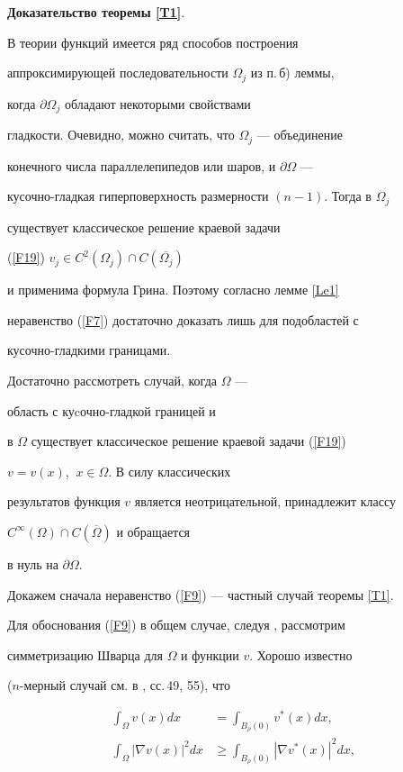 {\bf Доказательство теоремы \ref{T1}}.


В теории функций имеется ряд способов построения 


аппроксимирующей последовательности $\Omega_j$ из п.\,б) леммы, 


когда $\partial\Omega_j$ обладают некоторыми свойствами


гладкости. Очевидно, можно считать, что $\Omega_j$ --- объединение 


конечного числа параллелепипедов или шаров, и $\partial\Omega$ --- 


кусочно-гладкая гиперповерхность размерности $(n-1)$. Тогда в $\Omega_j$ 


существует классическое решение краевой задачи


(\ref{F19}) $v_j\in C^2(\Omega_j) \cap C(\overline{\Omega_j})$ 


и применима формула Грина. Поэтому согласно лемме \ref{Le1} 


неравенство (\ref{F7}) достаточно доказать лишь для подобластей с 


кусочно-гладкими границами. 


Достаточно рассмотреть случай, когда $\Omega$ --- 


область с куcочно-гладкой границей и


в $\Omega$ существует классическое решение краевой задачи (\ref{F19})


$v=v(x)$, $\ x\in\Omega$. В силу классических


результатов функция $v$ является неотрицательной, принадлежит классу


$C^\infty(\Omega)\cap C(\overline{\Omega})$ и обращается


в нуль на $\partial\Omega$.





Докажем сначала неравенство (\ref{F9}) --- частный случай теоремы \ref{T1}.





Для обоснования (\ref{F9}) в общем случае, следуя \cite{l1}, рассмотрим


симметризацию Шварца для $\Omega$ и функции $v$. Хорошо известно


($n$-мерный случай см. в \cite{l2}, сс.\,49, 55), что


\begin{align*}


\int_\Omega v(x) dx&=\int_{B_\rho (0)}v^*(x) dx,\\


\int_\Omega |\nabla v(x)|^2 dx &\geq \int_{B_\rho (0)}|\nabla v^*(x)|^2 dx,


\end{align*}


